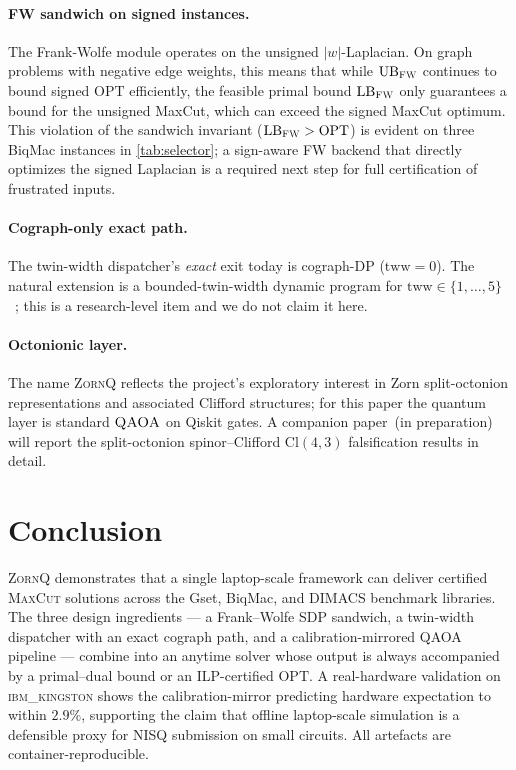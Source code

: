 \documentclass{article}
\theoremstyle{definition}
\theoremstyle{remark}
\newcommand{\MaxCut}{\textsc{MaxCut}\xspace}
\newcommand{\ZornQ}{\textsc{ZornQ}\xspace}
\newcommand{\QAOA}{\textsc{QAOA}\xspace}
\newcommand{\ILP}{\textsc{ILP}\xspace}
\newcommand{\FW}{\textsc{FW}\xspace}
\newcommand{\SDP}{\textsc{SDP}\xspace}
\newcommand{\OPT}{\mathrm{OPT}}
\newcommand{\LB}{\mathrm{LB}}
\newcommand{\UB}{\mathrm{UB}}
\newcommand{\tww}{\mathrm{tww}}
\begin{document}
\begin{sloppypar}
\paragraph{FW sandwich on signed instances.} The Frank-Wolfe module operates on the unsigned $|w|$-Laplacian. On graph problems with negative edge weights, this means that while $\UB_{\FW}$ continues to bound signed $\OPT$ efficiently, the feasible primal bound $\LB_{\FW}$ only guarantees a bound for the unsigned MaxCut, which can exceed the signed MaxCut optimum. This violation of the sandwich invariant ($\LB_{\FW} > \OPT$) is evident on three BiqMac instances in \cref{tab:selector}; a sign-aware FW backend that directly optimizes the signed Laplacian is a required next step for full certification of frustrated inputs.
\end{sloppypar}

\begin{sloppypar}
\paragraph{Cograph-only exact path.} The twin-width dispatcher's
\emph{exact} exit today is cograph-DP ($\tww = 0$). The natural
extension is a bounded-twin-width dynamic program for
$\tww \in \{1, \ldots, 5\}$~\cite{schidler2022sat,bonnet2022twin};
this is a research-level item and we do not claim it here.
\end{sloppypar}

\paragraph{Octonionic layer.} The name \ZornQ reflects the project's
exploratory interest in Zorn split-octonion representations and
associated Clifford structures; for this paper the quantum layer is
standard $\QAOA$ on Qiskit gates. A companion paper~(in preparation)
will report the split-octonion spinor--Clifford $\mathrm{Cl}(4,3)$
falsification results in detail.

\section{Conclusion}
\label{sec:conclusion}

\ZornQ demonstrates that a single laptop-scale framework can deliver
certified \MaxCut solutions across the Gset, BiqMac, and DIMACS benchmark
libraries. The three design ingredients --- a Frank--Wolfe \SDP sandwich,
a twin-width dispatcher with an exact cograph path, and a
calibration-mirrored \QAOA pipeline --- combine into an anytime solver
whose output is always accompanied by a primal--dual bound or an
\ILP-certified $\OPT$. A real-hardware validation on
\textsc{ibm\_kingston} shows the calibration-mirror predicting hardware
expectation to within $2.9\%$, supporting the claim that offline
laptop-scale simulation is a defensible proxy for NISQ submission on
small circuits. All artefacts are container-reproducible.
\end{document}
